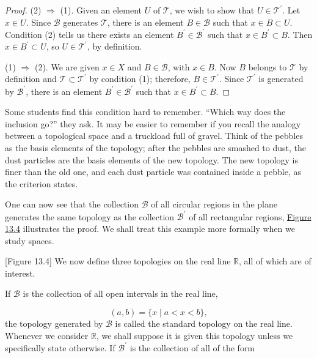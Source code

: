 \begin{proof}
 (2) \(\Rightarrow\) (1). Given an element \(U\) of \(\mathcal{T}\), we wish to show that \(U \in {\mathcal{T}}^{\prime }\). Let \(x \in U\). Since \(\mathcal{B}\) generates \(\mathcal{T}\), there is an element \(B \in \mathcal{B}\) such that \(x \in B \subset U\). Condition (2) tells us there exists an element \(B^{\prime } \in {\mathcal{B}}^{\prime }\) such that \(x \in {B}^{\prime } \subset B\). Then \(x \in {B}^{\prime } \subset U\), so \(U \in {\mathcal{T}}^{\prime }\), by definition.

 (1) \(\Rightarrow\) (2). We are given \(x \in X\) and \(B \in \mathcal{B}\), with \(x \in B\). Now \(B\) belongs to \(\mathcal{T}\) by definition and \(\mathcal{T} \subset {\mathcal{T}}^{\prime }\) by condition (1); therefore, \(B \in {\mathcal{T}}^{\prime }\). Since \(\mathcal{T}^{\prime }\) is generated by \(\mathcal{B}^{\prime }\), there is an element \(B^{\prime } \in {\mathcal{B}}^{\prime }\) such that \(x \in {B}^{\prime } \subset B\).
\end{proof}

Some students find this condition hard to remember. ``Which way does the inclusion go?'' they ask. It may be easier to remember if you recall the analogy between a topological space and a truckload full of gravel. Think of the pebbles as the basis elements of the topology; after the pebbles are smashed to dust, the dust particles are the basis elements of the new topology. The new topology is finer than the old one, and each dust particle was contained inside a pebble, as the criterion states.

\begin{centeredblock}
 \begin{example}
\label{ex:\thesection.\theexample}
  One can now see that the collection \(\mathcal{B}\) of all circular regions in the plane generates the same topology as the collection \(\mathcal{B}^{\prime }\) of all rectangular regions, \hyperref[fig:13.4]{Figure 13.4} illustrates the proof. We shall treat this example more formally when we study  spaces.

  [Figure 13.4]
  We now define three topologies on the real line \(\mathbb{R}\), all of which are of interest.
 \end{example}
\end{centeredblock}

\begin{definition}
 If \(\mathcal{B}\) is the collection of all open intervals in the real line,

 \[
 ( {a,b}) = \{ x \mid a < x < b\},
 \]
 the topology generated by \(\mathcal{B}\) is called the standard topology on the real line. Whenever we consider \(\mathbb{R}\), we shall suppose it is given this topology unless we specifically state otherwise.
 If \(\mathcal{B}^{\prime }\) is the collection of all  of the form
\end{definition}

